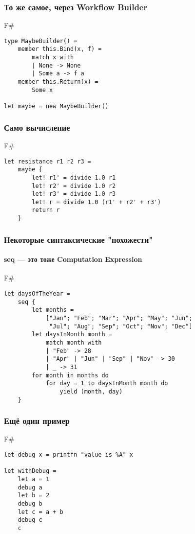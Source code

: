 \documentclass[xetex,mathserif,serif]{beamer}
\begin{document}
	\begin{frame}[fragile]
		\frametitle{То же самое, через Workflow Builder}
      		\begin{exampleblock}{F\#}
      			\begin{lstlisting}
type MaybeBuilder() =
    member this.Bind(x, f) = 
        match x with
        | None -> None
        | Some a -> f a
    member this.Return(x) = 
        Some x
   
let maybe = new MaybeBuilder()
\end{lstlisting}
\end{exampleblock}
\end{frame}	

	\begin{frame}[fragile]
		\frametitle{Само вычисление}
      		\begin{exampleblock}{F\#}
      			\begin{lstlisting}
let resistance r1 r2 r3 = 
    maybe {
        let! r1' = divide 1.0 r1
        let! r2' = divide 1.0 r2
        let! r3' = divide 1.0 r3
        let! r = divide 1.0 (r1' + r2' + r3')
        return r
    }
\end{lstlisting}
\end{exampleblock}
\end{frame}

	\begin{frame}[fragile]
		\frametitle{Некоторые синтаксические "похожести"}
		\framesubtitle{seq --- это тоже Computation Expression}
   		\begin{exampleblock}{F\#}
   			\begin{lstlisting}
let daysOfTheYear =
    seq {
        let months =
            ["Jan"; "Feb"; "Mar"; "Apr"; "May"; "Jun";
             "Jul"; "Aug"; "Sep"; "Oct"; "Nov"; "Dec"]
        let daysInMonth month =
            match month with
            | "Feb" -> 28
            | "Apr" | "Jun" | "Sep" | "Nov" -> 30
            | _ -> 31
        for month in months do
            for day = 1 to daysInMonth month do
                yield (month, day)
    }
\end{lstlisting}
\end{exampleblock}
\end{frame}

	\begin{frame}[fragile]
		\frametitle{Ещё один пример}
   		\begin{exampleblock}{F\#}
   			\begin{lstlisting}
let debug x = printfn "value is %A" x

let withDebug = 
    let a = 1
    debug a
    let b = 2
    debug b
    let c = a + b
    debug c
    c
\end{lstlisting}
\end{exampleblock}
\end{frame}
\end{document}
